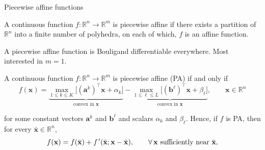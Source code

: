 \documentclass[aspectratio=169,xcolor=dvipsnames]{beamer}
\newcommand{\fp}{f\mkern2mu'}
\begin{document}
\begin{frame}{Piecewise affine functions}
  \small
  \setlength{\abovedisplayskip}{9pt}
  \setlength{\belowdisplayskip}{9pt}

  A {\color{MediumBlue}continuous} function $f:\mathbb{R}^n\to\mathbb{R}^m$
  is {\color{MediumBlue}piecewise affine} if there exists a partition of
  $\mathbb{R}^n$ into a finite number of polyhedra, on each of which, $f$ is
  an affine function.

  \vspace{0.12cm}
  A piecewise affine function is Bouligand differentiable everywhere.
  \textcolor{MediumRed}{Most interested in $m=1$.}

  \vspace{0.12cm}
  A \textcolor{MediumRed}{continuous} function
  $f:\mathbb{R}^n\to\mathbb{R}^m$ is piecewise affine (PA) if and only if
  \[
    f(\mathbf{x})=\underbrace{\max_{1\leq k\leq K}
      \bigl[(\mathbf{a}^k)^{\top}\mathbf{x}+\alpha_k\bigr]}_
      {\text{convex in }\mathbf{x}}
    -\underbrace{\max_{1\leq\ell\leq L}
      \bigl[(\mathbf{b}^{\ell})^{\top}\mathbf{x}+\beta_{\ell}\bigr]}_
      {\text{convex in }\mathbf{x}},\qquad\mathbf{x}\in\mathbb{R}^n
  \]

  for some constant vectors $\mathbf{a}^k$ and $\mathbf{b}^{\ell}$ and
  scalars $\alpha_k$ and $\beta_{\ell}$. Hence, if $f$ is PA, then for every
  $\bar{\mathbf{x}}\in\mathbb{R}^n$,
  \[
    f(\mathbf{x})=f(\bar{\mathbf{x}})
    +\fp (\bar{\mathbf{x}};\mathbf{x}-\bar{\mathbf{x}}),\qquad
    \forall\,\mathbf{x}\text{ sufficiently near }\bar{\mathbf{x}},
  \]
\end{frame}
\end{document}
